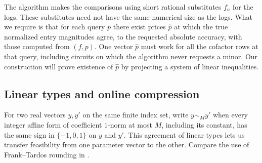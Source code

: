 The algorithm makes the comparisons using short rational substitutes
\(f_u\) for the logs. These substitutes need not have the same
numerical size as the logs. What we require is that for each query
\(p\) there exist prices \(\widehat p\) at which the true normalized
entry magnitudes agree, to the requested absolute accuracy, with
those computed from \((f,p)\). One vector \(\widehat p\) must work for
all the cofactor rows at that query, including circuits on which the
algorithm never requests a minor. Our construction will prove
existence of \(\widehat p\) by projecting a system of linear
inequalities.

\subsection{Linear types and online compression}

For two real vectors \(y,y'\) on the same finite index set, write
\(y\sim_M y'\) when every integer affine form of coefficient
\(1\)-norm at most \(M\), including its constant, has the same sign
in \(\{-1,0,1\}\) on \(y\) and \(y'\). This agreement of linear
types lets us transfer feasibility from one parameter vector to the
other. Compare the use of Frank--Tardos rounding in
\cite[Lemma~(6.6.1)]{GLS}.

